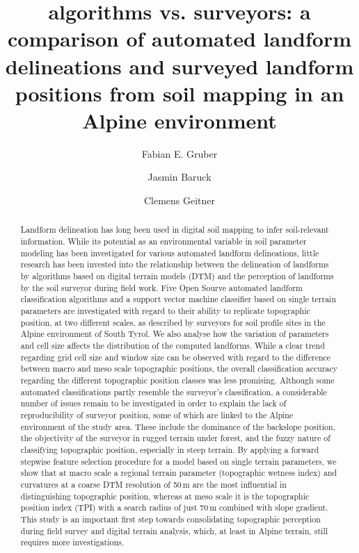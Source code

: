 \documentclass[preprint,12pt,authoryear]{elsarticle}
\begin{document}
\begin{frontmatter}

\title{algorithms vs. surveyors: a comparison of automated landform delineations and surveyed landform positions from soil mapping in an Alpine environment}



\author[mymainadress]{Fabian E. Gruber}
\author[mymainadress]{Jasmin Baruck}
\author[mymainadress]{Clemens Geitner}



\address[mymainadress]{Institute of Geography, University of Innsbruck}

\begin{abstract}
Landform delineation has long been used in digital soil mapping to infer soil-relevant information. While its potential as an environmental variable in soil parameter modeling has been investigated for various automated landform delineations, little research has been invested into the relationship between the delineation of landforms by algorithms based on digital terrain models (DTM) and the perception of landforms by the soil surveyor during field work. Five Open Sourve automated landform classification algorithms and a support vector machine classifier based on single terrain parameters are investigated  with regard to their ability to replicate topographic position, at two different scales, as described by surveyors for soil profile sites in the Alpine environment of South Tyrol. We also analyse how the variation of parameters and cell size affects the distribution of the computed landforms. While a clear trend regarding grid cell size and window size can be observed with regard to the difference between macro and meso scale topographic positions, the overall classification accuracy regarding the different topographic position classes was less promising. Although some automated classifications partly resemble the surveyor's classification, a considerable number of issues remain to be investigated in order to explain the lack of reproducibility of surveyor position, some of which are linked to the Alpine environment of the study area. These include the dominance of the backslope position, the objectivity of the surveyor in rugged terrain under forest, and the fuzzy nature of classifying topographic position, especially in steep terrain. By applying a forward stepwise feature selection procedure for a model based on single terrain parameters, we show that at macro scale a regional terrain parameter (topographic wetness index) and curvatures at a coarse DTM resolution of 50\,m are the most influential in distinguishing topographic position, whereas at meso scale it is the topographic position index (TPI) with a search radius of just 70\,m combined with slope gradient. This study is an important first step towards consolidating topographic perception during field survey and digital terrain analysis, which, at least in Alpine terrain, still requires more investigations.
 

\end{abstract}
\end{frontmatter}
\end{document}
